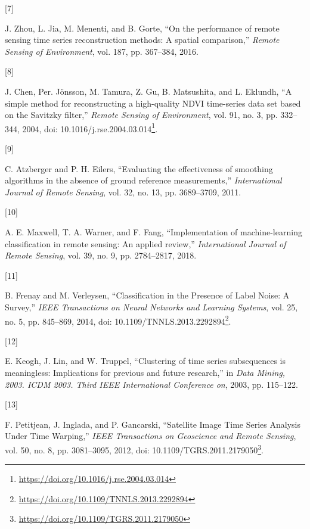 \documentclass[
  11pt,
]{report}
\newlength{\cslhangindent}
\newlength{\csllabelwidth}
\newlength{\cslentryspacingunit} %
\newenvironment{CSLReferences}[2] %
 {%
  \setlength{\parindent}{0pt}
  \ifodd #1
  \let\oldpar\par
  \def\par{\hangindent=\cslhangindent\oldpar}
  \fi
  \setlength{\parskip}{#2\cslentryspacingunit}
 }%
 {}
\newcommand{\CSLLeftMargin}[1]{\parbox[t]{\csllabelwidth}{#1}}
\newcommand{\CSLRightInline}[1]{\parbox[t]{\linewidth - \csllabelwidth}{#1}\break}
\renewcommand{\href}[2]{#2\footnote{\url{#1}}}
\begin{document}
\begin{CSLReferences}{0}{0}
\leavevmode{}%
\CSLLeftMargin{{[}7{]} }%
\CSLRightInline{J. Zhou, L. Jia, M. Menenti, and B. Gorte, {``On the
performance of remote sensing time series reconstruction methods: {A}
spatial comparison,''} \emph{Remote Sensing of Environment}, vol. 187,
pp. 367--384, 2016.}

\leavevmode{}%
\CSLLeftMargin{{[}8{]} }%
\CSLRightInline{J. Chen, Per. Jönsson, M. Tamura, Z. Gu, B. Matsushita,
and L. Eklundh, {``A simple method for reconstructing a high-quality
{NDVI} time-series data set based on the {Savitzky}\textendash{{Golay}}
filter,''} \emph{Remote Sensing of Environment}, vol. 91, no. 3, pp.
332--344, 2004, doi:
\href{https://doi.org/10.1016/j.rse.2004.03.014}{10.1016/j.rse.2004.03.014}.}

\leavevmode{}%
\CSLLeftMargin{{[}9{]} }%
\CSLRightInline{C. Atzberger and P. H. Eilers, {``Evaluating the
effectiveness of smoothing algorithms in the absence of ground reference
measurements,''} \emph{International Journal of Remote Sensing}, vol.
32, no. 13, pp. 3689--3709, 2011.}

\leavevmode{}%
\CSLLeftMargin{{[}10{]} }%
\CSLRightInline{A. E. Maxwell, T. A. Warner, and F. Fang,
{``Implementation of machine-learning classification in remote sensing:
An applied review,''} \emph{International Journal of Remote Sensing},
vol. 39, no. 9, pp. 2784--2817, 2018.}

\leavevmode{}%
\CSLLeftMargin{{[}11{]} }%
\CSLRightInline{B. Frenay and M. Verleysen, {``Classification in the
{Presence} of {Label Noise}: {A Survey},''} \emph{IEEE Transactions on
Neural Networks and Learning Systems}, vol. 25, no. 5, pp. 845--869,
2014, doi:
\href{https://doi.org/10.1109/TNNLS.2013.2292894}{10.1109/TNNLS.2013.2292894}.}

\leavevmode{}%
\CSLLeftMargin{{[}12{]} }%
\CSLRightInline{E. Keogh, J. Lin, and W. Truppel, {``Clustering of time
series subsequences is meaningless: {Implications} for previous and
future research,''} in \emph{Data {Mining}, 2003. {ICDM} 2003. {Third
IEEE International Conference} on}, 2003, pp. 115--122.}

\leavevmode{}%
\CSLLeftMargin{{[}13{]} }%
\CSLRightInline{F. Petitjean, J. Inglada, and P. Gancarski, {``Satellite
{Image Time Series Analysis Under Time Warping},''} \emph{IEEE
Transactions on Geoscience and Remote Sensing}, vol. 50, no. 8, pp.
3081--3095, 2012, doi:
\href{https://doi.org/10.1109/TGRS.2011.2179050}{10.1109/TGRS.2011.2179050}.}


\end{CSLReferences}
\end{document}
